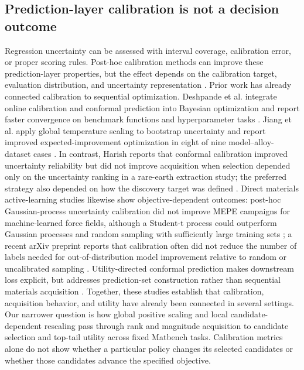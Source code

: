 \documentclass[11pt]{article}
\begin{document}
\subsection{Prediction-layer calibration is not a decision outcome}
Regression uncertainty can be assessed with interval coverage, calibration error, or proper scoring rules. Post-hoc calibration methods can improve these prediction-layer properties, but the effect depends on the calibration target, evaluation distribution, and uncertainty representation \citep{gneiting2007proper,kuleshov2018calibrated,ovadia2019uncertainty}. Prior work has already connected calibration to sequential optimization. Deshpande et al. integrate online calibration and conformal prediction into Bayesian optimization and report faster convergence on benchmark functions and hyperparameter tasks \citep{deshpande2024online}. Jiang et al. apply global temperature scaling to bootstrap uncertainty and report improved expected-improvement optimization in eight of nine model--alloy-dataset cases \citep{jiang2026calibration_optimization}. In contrast, Harish reports that conformal calibration improved uncertainty reliability but did not improve acquisition when selection depended only on the uncertainty ranking in a rare-earth extraction study; the preferred strategy also depended on how the discovery target was defined \citep{harish2026objective}. Direct materials active-learning studies likewise show objective-dependent outcomes: post-hoc Gaussian-process uncertainty calibration did not improve MEPE campaigns for machine-learned force fields, although a Student-t process could outperform Gaussian processes and random sampling with sufficiently large training sets \citep{thomasmitchell2023calibration}; a recent arXiv preprint reports that calibration often did not reduce the number of labels needed for out-of-distribution model improvement relative to random or uncalibrated sampling \citep{dale2025activelearning}. Utility-directed conformal prediction makes downstream loss explicit, but addresses prediction-set construction rather than sequential materials acquisition \citep{cortesgomez2025utility}. Together, these studies establish that calibration, acquisition behavior, and utility have already been connected in several settings. Our narrower question is how global positive scaling and local candidate-dependent rescaling pass through rank and magnitude acquisition to candidate selection and top-tail utility across fixed Matbench tasks. Calibration metrics alone do not show whether a particular policy changes its selected candidates or whether those candidates advance the specified objective.
\end{document}

